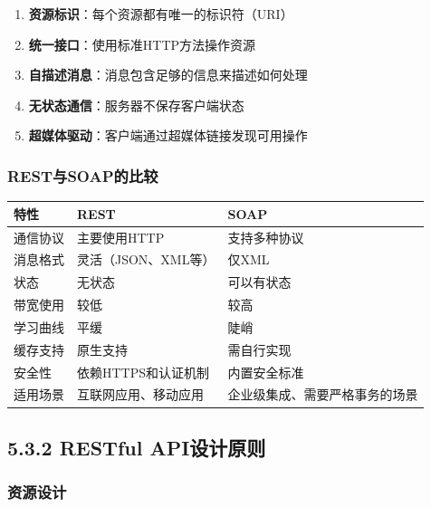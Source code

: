 \begin{enumerate}
\def\labelenumi{\arabic{enumi}.}
\tightlist
\item
  \textbf{资源标识}：每个资源都有唯一的标识符（URI）
\item
  \textbf{统一接口}：使用标准HTTP方法操作资源
\item
  \textbf{自描述消息}：消息包含足够的信息来描述如何处理
\item
  \textbf{无状态通信}：服务器不保存客户端状态
\item
  \textbf{超媒体驱动}：客户端通过超媒体链接发现可用操作
\end{enumerate}

\subsubsection{REST与SOAP的比较}\label{restux4e0esoapux7684ux6bd4ux8f83}

\begin{longtable}[]{@{}lll@{}}
\toprule\noalign{}
特性 & REST & SOAP \\
\midrule\noalign{}
\endhead
\bottomrule\noalign{}
\endlastfoot
通信协议 & 主要使用HTTP & 支持多种协议 \\
消息格式 & 灵活（JSON、XML等） & 仅XML \\
状态 & 无状态 & 可以有状态 \\
带宽使用 & 较低 & 较高 \\
学习曲线 & 平缓 & 陡峭 \\
缓存支持 & 原生支持 & 需自行实现 \\
安全性 & 依赖HTTPS和认证机制 & 内置安全标准 \\
适用场景 & 互联网应用、移动应用 & 企业级集成、需要严格事务的场景 \\
\end{longtable}

\subsection{5.3.2 RESTful
API设计原则}\label{restful-apiux8bbeux8ba1ux539fux5219}

\subsubsection{资源设计}\label{ux8d44ux6e90ux8bbeux8ba1}

